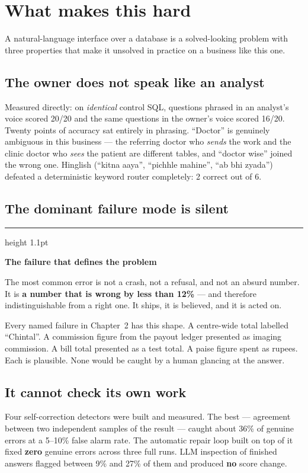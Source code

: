 \documentclass[11pt,a4paper]{report}
\newenvironment{keybox}[1]
 {\par\medskip\begin{center}\begin{minipage}{0.94\textwidth}%
  {\color{navy}\hrule height 1.1pt}\vspace{5pt}\par
  \textbf{\color{navy}#1}\par\vspace{3pt}\small}
 {\par\vspace{5pt}{\color{mist}\hrule height 0.8pt}\end{minipage}\end{center}\medskip}
\begin{document}
\section{What makes this hard}

A natural-language interface over a database is a solved-looking problem with three properties
that make it unsolved in practice on a business like this one.

\subsection{The owner does not speak like an analyst}

Measured directly: on \emph{identical} control SQL, questions phrased in an analyst's voice scored
20/20 and the same questions in the owner's voice scored 16/20. Twenty points of accuracy sat
entirely in phrasing. ``Doctor'' is genuinely ambiguous in this business --- the referring doctor
who \emph{sends} the work and the clinic doctor who \emph{sees} the patient are different tables,
and ``doctor wise'' joined the wrong one. Hinglish (``kitna aaya'', ``pichhle mahine'', ``ab bhi
zyada'') defeated a deterministic keyword router completely: 2 correct out of 6.

\subsection{The dominant failure mode is silent}

\begin{keybox}{The failure that defines the problem}
The most common error is not a crash, not a refusal, and not an absurd number. It is
\textbf{a number that is wrong by less than 12\%} --- and therefore indistinguishable from a right
one. It ships, it is believed, and it is acted on.
\end{keybox}

Every named failure in Chapter~2 has this shape. A centre-wide total labelled ``Chintal''. A
commission figure from the payout ledger presented as imaging commission. A bill total presented
as a test total. A paise figure spent as rupees. Each is plausible. None would be caught by a
human glancing at the answer.

\subsection{It cannot check its own work}

Four self-correction detectors were built and measured. The best --- agreement between two
independent samples of the result --- caught about 36\% of genuine errors at a 5--10\% false alarm
rate. The automatic repair loop built on top of it fixed \textbf{zero} genuine errors across three
full runs. LLM inspection of finished answers flagged between 9\% and 27\% of them and produced
\textbf{no} score change.
\end{document}
